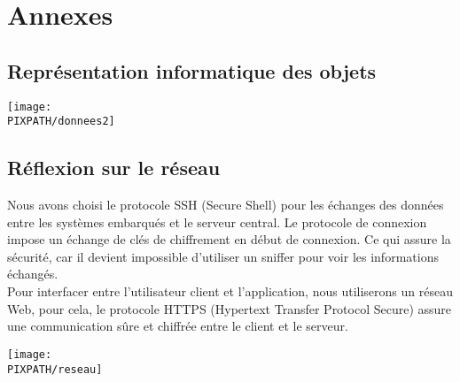 \section{Annexes}
\subsection{Représentation informatique des objets}
    \begin{center}
    \texttt{[image: \\PIXPATH/donnees2]}
    \end{center}
	
\subsection{Réflexion sur le réseau}
Nous avons choisi le protocole SSH (Secure Shell) pour les échanges des données entre les systèmes embarqués et le serveur central.  Le protocole de connexion impose un échange de clés de chiffrement en début de connexion. Ce qui assure la sécurité, car il devient impossible d'utiliser un sniffer pour voir les informations échangés. \\

Pour interfacer entre l’utilisateur client et l’application, nous utiliserons un réseau Web, pour cela, le protocole HTTPS (Hypertext Transfer Protocol Secure) assure une communication sûre et chiffrée entre le client et le serveur. \\

    \begin{center}
    \texttt{[image: \\PIXPATH/reseau]}
    \end{center}


